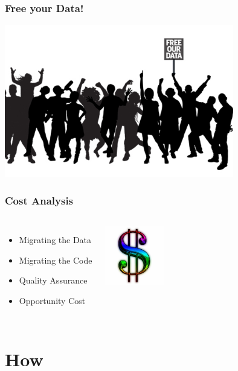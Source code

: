 \documentclass{beamer}
\begin{document}
\begin{frame}[fragile]
  \frametitle{Free your Data!}

\begin{center}
  \includegraphics[height=18em]{free-our-open-data.jpg}
\end{center}
\end{frame}

\begin{frame}[fragile]
  \frametitle{Cost Analysis}
  
  \vfill

\begin{columns}

  \begin{itemize}
  \item Migrating the Data
  \item Migrating the Code
  \item Quality Assurance
  \item Opportunity Cost
  \end{itemize}  

\begin{center}
  \includegraphics[height=7em]{Dollar-sign.jpg}
\end{center}
\end{columns}
\end{frame}

\section{How}
\end{document}
